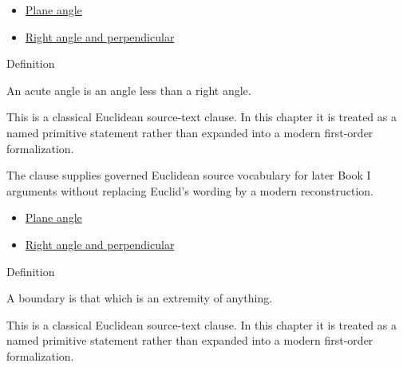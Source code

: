 \begin{lra-not-visible}
\begin{dependencies}
\begin{itemize}
  \item \hyperref[def:euclid-plane-angle]{Plane angle}
  \item \hyperref[def:euclid-right-angle-and-perpendicular]{Right angle and perpendicular}
\end{itemize}
\end{dependencies}
\end{lra-not-visible}

\begin{definitionbox}{Definition}
\begin{definition}
\label{def:euclid-acute-angle}
An acute angle is an angle less than a right angle.
\end{definition}
\end{definitionbox}
\begin{remark*}
This is a classical Euclidean source-text clause. In this chapter it is treated
as a named primitive statement rather than expanded into a modern first-order
formalization.
\end{remark*}

\begin{remark*}[Interpretation]
The clause supplies governed Euclidean source vocabulary for later Book I
arguments without replacing Euclid's wording by a modern reconstruction.
\end{remark*}

\begin{lra-not-visible}
\begin{dependencies}
\begin{itemize}
  \item \hyperref[def:euclid-plane-angle]{Plane angle}
  \item \hyperref[def:euclid-right-angle-and-perpendicular]{Right angle and perpendicular}
\end{itemize}
\end{dependencies}
\end{lra-not-visible}

\begin{definitionbox}{Definition}
\begin{definition}[Boundary]
\label{def:euclid-boundary}
A boundary is that which is an extremity of anything.
\end{definition}
\end{definitionbox}
\begin{remark*}
This is a classical Euclidean source-text clause. In this chapter it is treated
as a named primitive statement rather than expanded into a modern first-order
formalization.
\end{remark*}

